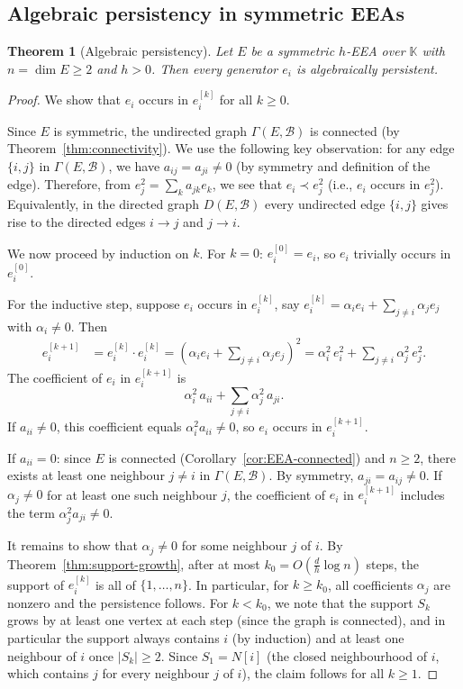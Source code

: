 \documentclass[12pt,a4paper]{amsart}
\newtheorem{theorem}{Theorem}[section]
\theoremstyle{definition}
\newcommand{\K}{\mathbb{K}}
\newcommand{\EA}{E}          %
\newcommand{\natbasis}{\mathcal{B}}  %
\begin{document}
\subsection{Algebraic persistency in symmetric EEAs}

\begin{theorem}[Algebraic persistency]\label{thm:persistency}
Let $\EA$ be a symmetric $h$-EEA over $\K$ with $n=\dim\EA\ge 2$ and
$h>0$.  Then every generator $e_i$ is algebraically persistent.
\end{theorem}

\begin{proof}
We show that $e_i$ occurs in $e_i^{[k]}$ for all $k\ge 0$.

Since $\EA$ is symmetric, the undirected graph $\varGamma(\EA,\natbasis)$
is connected (by Theorem~\ref{thm:connectivity}).  We use the following
key observation: for any edge $\{i,j\}$ in $\varGamma(\EA,\natbasis)$,
we have $a_{ij}=a_{ji}\ne 0$ (by symmetry and definition of the edge).
Therefore, from $e_j^2=\sum_k a_{jk} e_k$, we see that $e_i\prec e_j^2$
(i.e., $e_i$ occurs in $e_j^2$).  Equivalently, in the directed graph
$D(\EA,\natbasis)$ every undirected edge $\{i,j\}$ gives rise to the
directed edges $i\to j$ and $j\to i$.

\medskip
We now proceed by induction on $k$.  For $k=0$: $e_i^{[0]}=e_i$, so
$e_i$ trivially occurs in $e_i^{[0]}$.

For the inductive step, suppose $e_i$ occurs in $e_i^{[k]}$, say
$e_i^{[k]}=\alpha_i e_i + \sum_{j\ne i}\alpha_j e_j$ with
$\alpha_i\ne 0$.  Then
\begin{align*}
  e_i^{[k+1]} &= e_i^{[k]}\cdot e_i^{[k]}
  = \left(\alpha_i e_i + \sum_{j\ne i}\alpha_j e_j\right)^2
  = \alpha_i^2\,e_i^2 + \sum_{j\ne i}\alpha_j^2\,e_j^2.
\end{align*}
The coefficient of $e_i$ in $e_i^{[k+1]}$ is
\[
  \alpha_i^2\,a_{ii} + \sum_{j\ne i}\alpha_j^2\,a_{ji}.
\]
If $a_{ii}\ne 0$, this coefficient equals $\alpha_i^2 a_{ii}\ne 0$, so
$e_i$ occurs in $e_i^{[k+1]}$.

If $a_{ii}=0$: since $\EA$ is connected (Corollary~\ref{cor:EEA-connected})
and $n\ge 2$, there exists at least one neighbour $j\ne i$ in
$\varGamma(\EA,\natbasis)$.  By symmetry, $a_{ji}=a_{ij}\ne 0$.  If
$\alpha_j\ne 0$ for at least one such neighbour $j$, the coefficient
of $e_i$ in $e_i^{[k+1]}$ includes the term $\alpha_j^2 a_{ji}\ne 0$.

It remains to show that $\alpha_j\ne 0$ for some neighbour $j$ of $i$.
By Theorem~\ref{thm:support-growth}, after at most $k_0=O(\frac{d}{h}
\log n)$ steps, the support of $e_i^{[k]}$ is all of $\{1,\ldots,n\}$.
In particular, for $k\ge k_0$, all coefficients $\alpha_j$ are nonzero
and the persistence follows.  For $k<k_0$, we note that the support
$S_k$ grows by at least one vertex at each step (since the graph is
connected), and in particular the support always contains $i$ (by
induction) and at least one neighbour of $i$ once $|S_k|\ge 2$.  Since
$S_1=N[i]$ (the closed neighbourhood of $i$, which contains $j$ for
every neighbour $j$ of $i$), the claim follows for all $k\ge 1$.
\end{proof}
\end{document}

